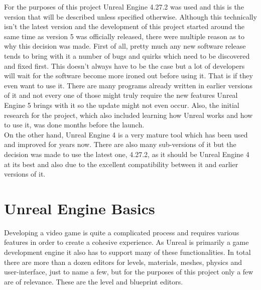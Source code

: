 For the purposes of this project Unreal Engine 4.27.2 was used and this is the version that will be described unless specified otherwise. Although this technically isn't the latest version and the development of this project started around the same time as version 5 was officially released, there were multiple reason as to why this decision was made. First of all, pretty much any new software release tends to bring with it a number of bugs and quirks which need to be discovered and fixed first. This doesn't always have to be the case but a lot of developers will wait for the software become more ironed out before using it. That is if they even want to use it. There are many programs already written in earlier versions of it and not every one of those might truly require the new features Unreal Engine 5 brings with it so the update might not even occur. Also, the initial research for the project, which also included learning how Unreal works and how to use it, was done months before the launch.\\ 
On the other hand, Unreal Engine 4 is a very mature tool which has been used and improved for years now. There are also many sub-versions of it but the decision was made to use the latest one, 4.27.2, as it should be Unreal Engine 4 at its best and also due to the excellent compatibility between it and earlier versions of it.

\section{Unreal Engine Basics}\label{sec:Grundlage1}
Developing a video game is quite a complicated process and requires various features in order to create a cohesive experience. As Unreal is primarily a game development engine it also has to support many of these functionalities. In total there are more than a dozen editors for levels, materials, meshes, physics and user-interface\cite{bib:UEEditors}, just to name a few, but for the purposes of this project only a few are of relevance. These are the level and blueprint editors.\\

